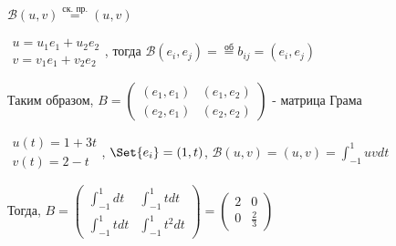 \documentclass[12pt]{article}
\begin{document}
    \Ex $\mathcal{B}(u, v) \stackrel{\text{ск. пр.}}{=} (u, v)$

    $\displaystyle \begin{matrix}u = u_1 e_1 + u_2 e_2 \\ v = v_1 e_1 + v_2 e_2\end{matrix}$, тогда $\displaystyle \mathcal{B}(e_i, e_j) = \stackrel{\text{об}}{=} b_{ij} = (e_i, e_j)$

    Таким образом, $\displaystyle B = \begin{pmatrix}(e_1, e_1) & (e_1, e_2) \\ (e_2, e_1) & (e_2, e_2)\end{pmatrix}$ - матрица Грама

    \Ex $\begin{matrix}u(t) = 1 + 3t \\ v(t) = 2 - t\end{matrix}$, $\displaystyle \Set{e_i} = (1, t)$, $\displaystyle \mathcal{B}(u, v) = (u, v) = \int_{-1}^1 uv dt$

    Тогда, $\displaystyle B = \begin{pmatrix}\int_{-1}^1 dt & \int_{-1}^1 t dt \\ \int_{-1}^1 t dt & \int_{-1}^1 t^2 dt\end{pmatrix} = \begin{pmatrix}2 & 0 \\ 0 & \frac{2}{3}\end{pmatrix}$
\end{document}
